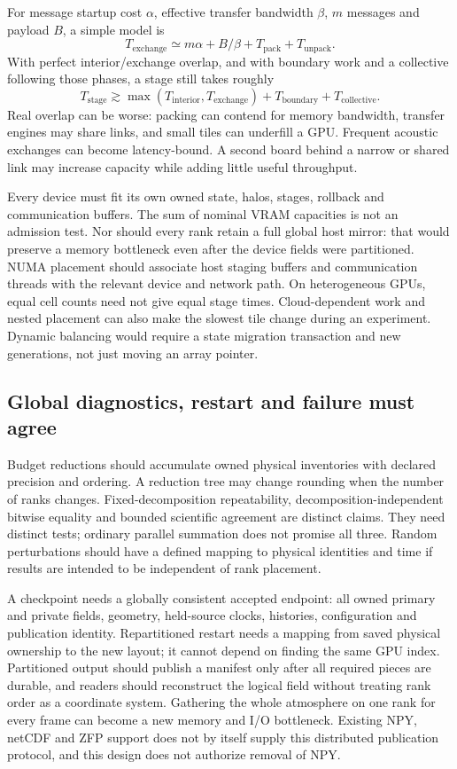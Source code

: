 For message startup cost $\alpha$, effective transfer bandwidth $\beta$,
$m$ messages and payload $B$, a simple model is
\[
 T_{\mathrm{exchange}}\simeq m\alpha+B/\beta
       +T_{\mathrm{pack}}+T_{\mathrm{unpack}}.
\]
With perfect interior/exchange overlap, and with boundary work and a collective
following those phases, a stage still takes roughly
\[
 T_{\mathrm{stage}}\gtrsim
 \max(T_{\mathrm{interior}},T_{\mathrm{exchange}})
 +T_{\mathrm{boundary}}+T_{\mathrm{collective}}.
\]
Real overlap can be worse: packing can contend for memory bandwidth, transfer
engines may share links, and small tiles can underfill a GPU. Frequent acoustic
exchanges can become latency-bound. A second board behind a narrow or shared
link may increase capacity while adding little useful throughput.

Every device must fit its own owned state, halos, stages, rollback and
communication buffers. The sum of nominal VRAM capacities is not an admission
test. Nor should every rank retain a full global host mirror: that would
preserve a memory bottleneck even after the device fields were partitioned.
NUMA placement should associate host staging buffers and communication threads
with the relevant device and network path. On heterogeneous GPUs, equal cell
counts need not give equal stage times. Cloud-dependent work and nested
placement can also make the slowest tile change during an experiment.
Dynamic balancing would require a state migration transaction and new
generations, not just moving an array pointer.

\subsection{Global diagnostics, restart and failure must agree}

Budget reductions should accumulate owned physical inventories with declared
precision and ordering. A reduction tree may change rounding when the number
of ranks changes. Fixed-decomposition repeatability, decomposition-independent
bitwise equality and bounded scientific agreement are distinct claims. They
need distinct tests; ordinary parallel summation does not promise all three.
Random perturbations should have a defined mapping to physical identities and
time if results are intended to be independent of rank placement.

A checkpoint needs a globally consistent accepted endpoint: all owned primary
and private fields, geometry, held-source clocks, histories, configuration and
publication identity. Repartitioned restart needs a mapping from saved physical
ownership to the new layout; it cannot depend on finding the same GPU index.
Partitioned output should publish a manifest only after all required pieces
are durable, and readers should reconstruct the logical field without treating
rank order as a coordinate system. Gathering the whole atmosphere on one rank
for every frame can become a new memory and I/O bottleneck. Existing NPY,
netCDF and ZFP support does not by itself supply this distributed publication
protocol, and this design does not authorize removal of NPY.

